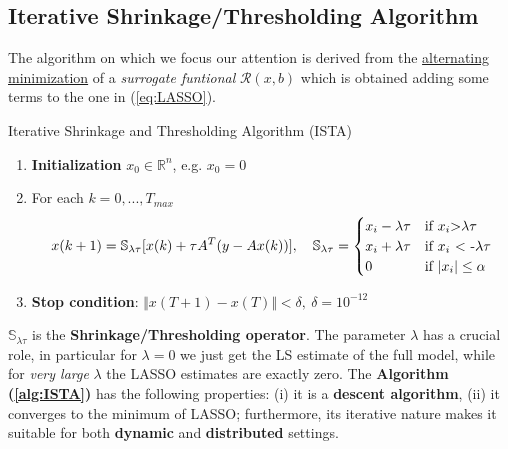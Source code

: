 \vspace{-0.2cm}
\subsection*{Iterative Shrinkage/Thresholding Algorithm}
The algorithm on which we focus our attention is derived from the \underline{alternating minimization} of a \textit{surrogate funtional} $\mathcal{R}(x,b)$ which is obtained adding some terms to the one in (\ref{eq:LASSO}). 
\begin{algorithm}
    \caption{Iterative Shrinkage and Thresholding Algorithm (ISTA)} \label{alg:ISTA}

    \vspace{0.3cm}
    \begin{enumerate}   
        \itemsep-0.3em
        \item  \textsf{\textbf{Initialization}} $x_0 \in \mathbb{R}^n$, e.g. $x_0=0$
        \item \textsf{For each $k=0, ..., T_{max}$}
        \vspace{-0.5cm}
        \begin{equation*}
            x(k+1)=\mathbb{S}_{\lambda\tau}[x(k)+\tau A^T(y-Ax(k))], \quad 
            \mathbb{S}_{\lambda\tau}=
            \begin{cases}
                x_i-{\lambda\tau} & \text{if $x_i$>${\lambda\tau}$} \\
                x_i+{\lambda\tau} & \text{if $x_i$ < -${\lambda\tau}$}\\
                0 & \text{if $ \lvert x_i \rvert \le \alpha$}\\ 
            \end{cases}
        \end{equation*}
        \vspace{-0.7cm}
        \item \textbf{\textsf{Stop condition}}: $\Vert x(T+1) - x(T) \Vert < \delta,\ \delta=10^{-12}$
    \end{enumerate}
\end{algorithm}


\noindent
 $\mathbb{S}_{\lambda\tau}$ is the \textbf{Shrinkage/Thresholding operator}.
 The parameter $\lambda$ has a crucial role, in particular for $\lambda=0$ we just get the LS estimate of the full model, while for \textit{very large} $\lambda$ the LASSO estimates are exactly zero.
The \textbf{Algorithm (\ref{alg:ISTA})} has the following properties: (i) it is a \textbf{descent algorithm}, (ii) it converges to the minimum of LASSO; furthermore, its iterative nature makes it suitable for both \textbf{dynamic} and \textbf{distributed} settings.
\vspace{-0.2cm}
